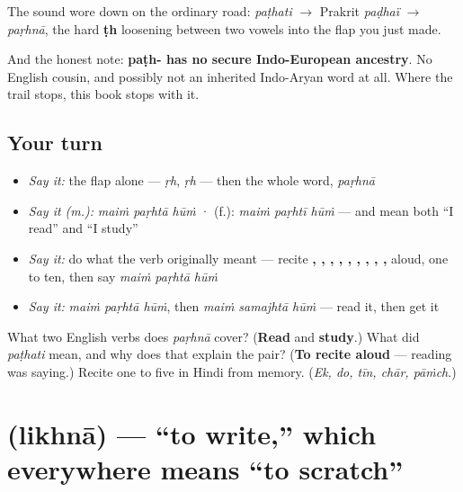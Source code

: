 The sound wore down on the ordinary road: \emph{paṭhati} $\to$ Prakrit \emph{paḍhaï} $\to$ \emph{paṛhnā}, the hard \textbf{ṭh} loosening between two vowels into the flap you just made.

And the honest note: \textbf{paṭh- has no secure Indo-European ancestry}. No English cousin, and possibly not an inherited Indo-Aryan word at all. Where the trail stops, this book stops with it.

\subsection*{Your turn}
\begin{itemize}
\raggedright
  \item \emph{Say it:} the flap alone — \emph{ṛh}, \emph{ṛh} — then the whole word, \emph{paṛhnā}
  \item \emph{Say it (m.):} \emph{maiṁ paṛhtā hūṁ}  ·  (f.): \emph{maiṁ paṛhtī hūṁ} — and mean both \textquotedblleft{}I read\textquotedblright{} and \textquotedblleft{}I study\textquotedblright{}
  \item \emph{Say it:} do what the verb originally meant — recite \textbf{, , , , , , , , , } aloud, one to ten, then say \emph{maiṁ paṛhtā hūṁ}
  \item \emph{Say it:} \emph{maiṁ paṛhtā hūṁ}, then \emph{maiṁ samajhtā hūṁ} — read it, then get it
\end{itemize}

\begin{tcolorbox}[breakable,colback=teal!4,colframe=teal!35!black,title={Before you move on}]
What two English verbs does \emph{paṛhnā} cover? (\textbf{Read} and \textbf{study}.) What did \emph{paṭhati} mean, and why does that explain the pair? (\textbf{To recite aloud} — reading was saying.) Recite one to five in Hindi from memory. (\emph{Ek, do, tīn, chār, pāṁch}.)
\end{tcolorbox}
\section[\texorpdfstring{\hi{लिखना} / \hi{लिख} … (likhnā / likh …)}{लिखना / लिख … (likhnā / likh …)}]{ (likhnā) — \textquotedblleft{}to write,\textquotedblright{} which everywhere means \textquotedblleft{}to scratch\textquotedblright{}}

\label{lesson:HI-C34-likhna}



